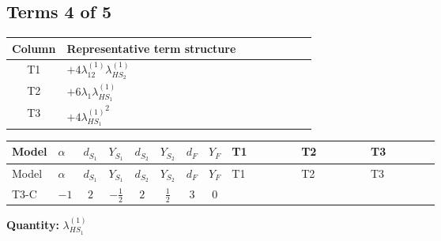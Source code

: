 \documentclass[8pt]{article}
\begin{document}
\begin{landscape}
\subsection*{Terms 4 of 5}
\begin{center}
\begin{tabular}{@{}c >{\raggedright\arraybackslash}p{0.82\linewidth}@{}}
\toprule
Column & Representative term structure \\
\midrule
T1 & \(\displaystyle +4 {\lambda_{12}^{(1)}} {\lambda_{HS_2}^{(1)}}\) \\
\midrule
T2 & \(\displaystyle +6 {\lambda_1} {\lambda_{HS_1}^{(1)}}\) \\
\midrule
T3 & \(\displaystyle +4 {\lambda_{HS_1}^{(1)}}^2\) \\
\midrule
\bottomrule
\end{tabular}
\end{center}
\smallskip
\tiny
\begin{longtable}{@{}llcccccc >{\raggedright\arraybackslash}p{0.21\linewidth} >{\raggedright\arraybackslash}p{0.21\linewidth} >{\raggedright\arraybackslash}p{0.21\linewidth}@{}}
\toprule
Model & $\alpha$ & $d_{S_1}$ & $Y_{S_1}$ & $d_{S_2}$ & $Y_{S_2}$ & $d_F$ & $Y_F$ & T1 & T2 & T3 \\
\midrule
\endfirsthead
\toprule
Model & $\alpha$ & $d_{S_1}$ & $Y_{S_1}$ & $d_{S_2}$ & $Y_{S_2}$ & $d_F$ & $Y_F$ & T1 & T2 & T3 \\
\midrule
\endhead
T3-C & $-1$ & $2$ & $-\frac{1}{2}$ & $2$ & $\frac{1}{2}$ & $3$ & $0$ & \scriptsize\adjustbox{max width=\linewidth}{$\begin{gathered} +4 {\lambda_{12}^{(1)}} {\lambda_{HS_2}^{(1)}}\end{gathered}$} & \scriptsize\adjustbox{max width=\linewidth}{$\begin{gathered} +6 {\lambda_1} {\lambda_{HS_1}^{(1)}}\end{gathered}$} & \scriptsize\adjustbox{max width=\linewidth}{$\begin{gathered} +4 {\lambda_{HS_1}^{(1)}}^2\end{gathered}$} \\
\midrule
\bottomrule
\end{longtable}
\clearpage
\noindent\textbf{Quantity: }$\lambda_{HS_1}^{(1)}$\par\smallskip

\end{landscape}
\end{document}
